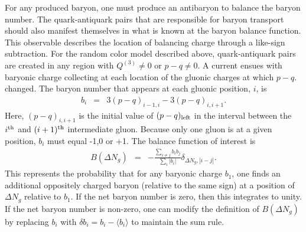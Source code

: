 \documentclass[aps, prc, 12pt, nofootinbib, showpacs, superscriptaddress, tightenlines, groupedaddress]{revtex4-2}
\begin{document}
For any produced baryon, one must produce an antibaryon to balance the baryon number. The quark-antiquark pairs that are responsible for baryon transport should also manifest themselves in what is known at the baryon balance function. This observable describes the location of balancing charge through a like-sign subtraction. For the random color model described above, quark-antiquark pairs are created in any region with $Q^{(3)}\ne 0$ or $p-q\ne 0$. A current ensues with baryonic charge collecting at each location of the gluonic charges at which $p-q$. changed. The baryon number that appears at each gluonic position, $i$, is 
\begin{eqnarray}
 b_i&=&3(p-q)_{i-1,i}-3(p-q)_{i,i+1}.
 \end{eqnarray}
 Here, $(p-q)_{i,i+1}$ is the initial value of $(p-q)_{\rm left}$ in the interval between the $i^{\rm th}$ and $(i+1)^{\rm th}$ intermediate gluon. Because only one gluon is at a given position, $b_i$ must equal -1,0 or +1. The balance function of interest is
\begin{eqnarray}
B(\Delta N_g)&=&-\frac{\sum_{i\ne j}b_ib_j}{\sum_i|b_i|}\delta_{\Delta N_g,|i-j|}.
\end{eqnarray}
This represents the probability that for any baryonic charge $b_1$, one finds an additional oppositely charged baryon (relative to the same sign) at a position of $\Delta N_g$ relative to $b_1$. If the net baryon number is zero, then this integrates to unity. If the net baryon number is non-zero, one can modify the definition of $B(\Delta N_g)$ by replacing $b_i$ with $\delta b_i=b_i-\langle b_i\rangle$ to maintain the sum rule. 
\end{document}

